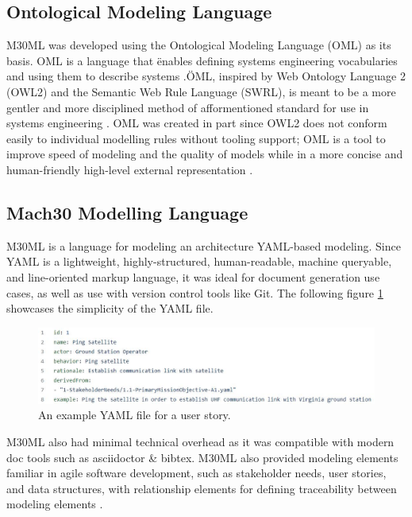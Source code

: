 \documentclass[conf]{new-aiaa}
\begin{document}
\subsection{Ontological Modeling Language}

M30ML was developed using the Ontological Modeling Language (OML) as its basis. OML is a language that \"enables defining systems engineering vocabularies and using them to describe systems \cite{oml_language}.\" OML, inspired by Web Ontology Language 2 (OWL2) and the Semantic Web Rule Language (SWRL), is meant to be a more gentler and more disciplined method of afformentioned standard for use in systems engineering \cite{oml_language}. OML was created in part since OWL2 does not conform easily to individual modelling rules without tooling support; OML is a tool to improve speed of modeling and the quality of models while in a more concise and human-friendly high-level external representation \cite{oml_origin_and_rationale}.

\subsection{Mach30 Modelling Language}

M30ML is a language for modeling an architecture YAML-based modeling. Since YAML is a lightweight, highly-structured, human-readable, machine queryable, and line-oriented markup language, it was ideal for document generation use cases, as well as use with version control tools like Git. The following figure \ref{user_story} showcases the simplicity of the YAML file.

\begin{figure}[hbt!]
    \centering
    \includegraphics[width=.8\textwidth]{ping_satellite}
    \caption{An example YAML file for a user story.}
    \label{user_story}
\end{figure}

M30ML also had minimal technical overhead as it was compatible with modern doc tools such as asciidoctor \& bibtex. M30ML also provided modeling elements familiar in agile software development, such as stakeholder needs, user stories, and data structures, with relationship elements for defining traceability between modeling elements \cite{mach30_git}.
\end{document}
